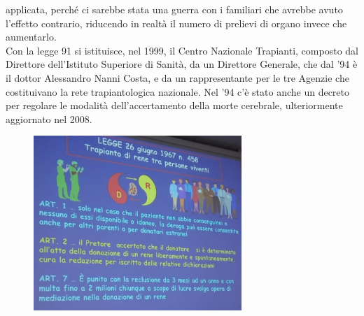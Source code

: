 applicata, perché ci sarebbe stata una guerra con i familiari che
avrebbe avuto l'effetto contrario, riducendo in realtà il numero di
prelievi di organo invece che aumentarlo.
\\
Con la legge 91 si istituisce, nel 1999, il Centro Nazionale Trapianti,
composto dal Direttore dell'Istituto Superiore di Sanità, da un
Direttore Generale, che dal '94 è il dottor Alessandro Nanni Costa, e da
un rappresentante per le tre Agenzie che costituivano la rete
trapiantologica nazionale. Nel '94 c'è stato anche un decreto per
regolare le modalità dell'accertamento della morte cerebrale,
ulteriormente aggiornato nel 2008.
\begin{figure}[!ht]
\centering
	\includegraphics[width=0.7\textwidth]{34/image1.jpeg}
	\end{figure}


